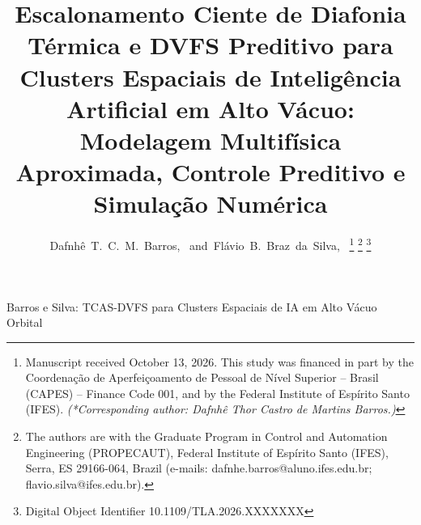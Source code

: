 \documentclass[journal]{IEEEtran}
\begin{document}
\title{Escalonamento Ciente de Diafonia T\'ermica e DVFS Preditivo para Clusters Espaciais de Intelig\^encia Artificial em Alto V\'acuo:\\ Modelagem Multif\'isica Aproximada, Controle Preditivo e Simula\c{c}\~ao Num\'erica}

\author{Dafnh\^e~T.~C.~M.~Barros,~
        and~Fl\'avio~B.~Braz~da~Silva,~%
\thanks{Manuscript received October 13, 2026. This study was financed in part by the Coordena\c{c}\~ao de Aperfei\c{c}oamento de Pessoal de N\'ivel Superior -- Brasil (CAPES) -- Finance Code 001, and by the Federal Institute of Esp\'irito Santo (IFES). \textit{(*Corresponding author: Dafnh\^e Thor Castro de Martins Barros.)}}%
\thanks{The authors are with the Graduate Program in Control and Automation Engineering (PROPECAUT), Federal Institute of Esp\'irito Santo (IFES), Serra, ES 29166-064, Brazil (e-mails: dafnhe.barros@aluno.ifes.edu.br; flavio.silva@ifes.edu.br).}%
\thanks{Digital Object Identifier 10.1109/TLA.2026.XXXXXXX}%
}

%
{Barros e Silva: TCAS-DVFS para Clusters Espaciais de IA em Alto Vácuo Orbital}

\maketitle
\end{document}
